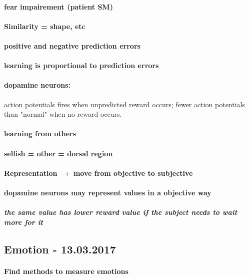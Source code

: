 \documentclass[12pt,article,oneside,a4paper]{memoir}
\begin{document}
\paragraph{fear impairement (patient SM)}
\paragraph{Similarity = shape, etc}
\paragraph{positive and negative prediction errors}
\paragraph{learning is proportional to prediction errors}

\paragraph{dopamine neurons:} action potentials fires when unpredicted reward occurs; fewer action potentials than "normal" when no reward occurs.

\paragraph{learning from others}
\paragraph{selfish = other = dorsal region}

\paragraph{Representation $\rightarrow$ move from objective to subjective}
\paragraph{dopamine neurons may represent values in a objective way}
\subparagraph{the same value has lower reward value if the subject needs to wait more for it}

\subsection{Emotion - 13.03.2017}
\paragraph{Find methods to measure emotions}
\end{document}
